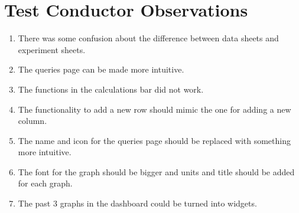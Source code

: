 \documentclass{article}
\begin{document}
\section{Test Conductor Observations}
\begin{enumerate}
  \item There was some confusion about the difference between data sheets and experiment sheets.
  \item The queries page can be made more intuitive.
  \item The functions in the calculations bar did not work.
  \item The functionality to add a new row should mimic the one for adding a new column.
  \item The name and icon for the queries page should be replaced with something more intuitive.
  \item The font for the graph should be bigger and units and title should be added for each graph.
  \item The past 3 graphs in the dashboard could be turned into widgets.
\end{enumerate}
\end{document}

